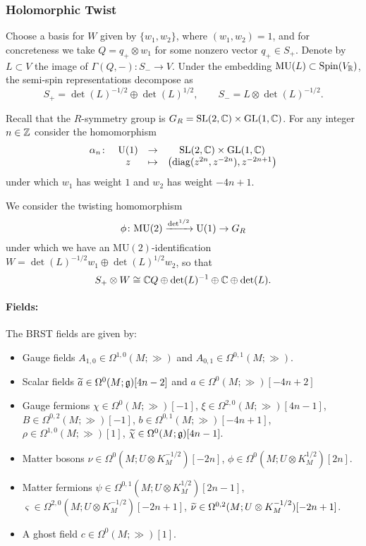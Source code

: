 \documentclass[10pt, oneside]{article}
\newcommand{\MU}{\mathrm{MU}}
\renewcommand{\U}{\mathrm{U}}
\begin{document}
\subsubsection{Holomorphic Twist}
\label{sect:4d_2_holomorphictwist}

Choose a basis for $W$ given by $\{w_1, w_2\}$, where $(w_1, w_2) = 1$, and for concreteness we take $Q=q_+ \otimes w_1$ for some nonzero vector $q_+ \in S_+$. Denote by $L\subset V$ the image of $\Gamma(Q, -)\colon S_-\rightarrow V$. Under the embedding $\MU(L) \subset \Spin(V_\RR)$, the semi-spin representations decompose as
\[
S_+ = \det(L)^{-1/2} \oplus \det(L)^{1/2},\qquad S_- = L \otimes \det(L)^{-1/2} .
\]

Recall that the $R$-symmetry group is $G_R = \SL(2, \CC) \times \GL(1, \CC)$. For any integer $n\in\ZZ$ consider the homomorphism 
\[
\begin{array}{ccccc}
\alpha_n \colon & \U(1) & \rightarrow & \SL(2, \CC)\times \GL(1, \CC)\\
&  z & \mapsto & \left({\rm diag}(z^{2n}, z^{-2n}) , z^{-2n+1} \right)
\end{array}
\]
under which $w_1$ has weight $1$ and $w_2$ has weight $-4n+1$.

We consider the twisting homomorphism 
\[
\phi \colon \MU(2) \xto{\det^{1/2}} \U(1) \rightarrow G_R
\]
under which we have an $\MU(2)$-identification $W=\det(L)^{-1/2}w_1 \oplus \det(L)^{1/2}w_2$, so that
\[S_+\otimes W\cong \CC Q\oplus \det(L)^{-1}\oplus \CC\oplus \det(L).\]

\vspace{-10pt}
\paragraph{Fields:} The BRST fields are given by:
\begin{itemize}
\item Gauge fields $A_{1, 0}\in\Omega^{1, 0}(M; \gg)$ and $A_{0, 1}\in\Omega^{0, 1}(M; \gg)$.
\item Scalar fields $\Tilde{a} \in \Omega^{0}(M; \gg)[4n-2]$ and $a \in\Omega^{0}(M; \gg)[-4n+2]$
\item Gauge fermions $\chi \in \Omega^0(M ; \gg)[-1]$, $\xi \in \Omega^{2,0}(M ; \gg)[4n-1]$, $B \in \Omega^{0,2}(M ; \gg)[-1]$, $b \in \Omega^{0,1}(M ; \gg)[-4n+1]$, $\rho \in \Omega^{1,0}(M ; \gg)[1]$,  $\Tilde{\chi} \in \Omega^0(M ; \gg)[4n-1]$.
\item Matter bosons $\nu\in\Omega^0(M; U\otimes K_M^{-1/2})[-2n]$, $\phi\in\Omega^0(M; U\otimes K_M^{1/2})[2n]$.
\item Matter fermions $\psi \in \Omega^{0,1} (M ;  U\otimes K_M^{1/2})[2n-1]$, $\varsigma \in \Omega^{2,0} (M ; U\otimes K_M^{-1/2})[-2n+1]$, $\Tilde{\nu} \in \Omega^{0,2}(M ; U\otimes K_M^{-1/2})[-2n+1]$.
\item A ghost field $c\in \Omega^0(M; \gg)[1]$.
\end{itemize}
\end{document}
